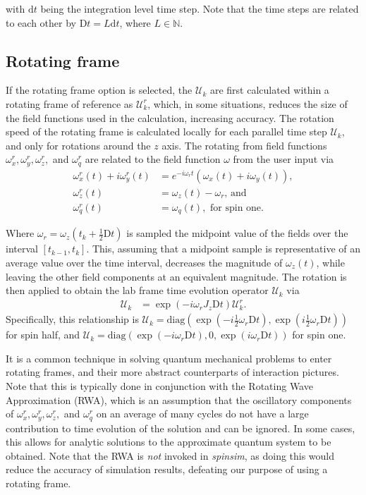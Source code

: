 \documentclass{jors}
\begin{document}
		with \(\mathrm{d}t\) being the integration level time step.
		Note that the time steps are related to each other by \(\mathrm{D}t = L\mathrm{d}t\), where \(L\in\mathbb{N}\).

	\subsection{Rotating frame}
		If the rotating frame option is selected, the \(\mathcal{U}_k\) are first calculated within a rotating frame of reference as \(\mathcal{U}^r_k\), which, in some situations, reduces the size of the field functions used in the calculation, increasing accuracy.
		The rotation speed of the rotating frame is calculated locally for each parallel time step \(\mathcal{U}_k\), and only for rotations around the \(z\) axis.
		The rotating from field functions \(\omega^r_x, \omega^r_y, \omega^r_z,\) and \(\omega^r_q\) are related to the field function \(\omega\) from the user input via
		\begin{align}
			\omega^r_x(t) + i\omega^r_y(t) &= e^{-i \omega_r t}(\omega_x(t) + i\omega_y(t)),\\
			\omega^r_z(t) &= \omega_z(t) - \omega_r\textrm{, and}\\
			\omega^r_q(t) &= \omega_q(t), \textrm{ for spin one.}
		\end{align}
		
		Where \(\omega_r = \omega_z(t_k + \frac12\mathrm{D}t)\) is sampled the midpoint value of the fields over the interval \([t_{k - 1}, t_k]\).
		This, assuming that a midpoint sample is representative of an average value over the time interval, decreases the magnitude of \(\omega_z(t)\), while leaving the other field components at an equivalent magnitude.
		The rotation is then applied to obtain the lab frame time evolution operator \(\mathcal{U}_k\) via
		\begin{align}
			\mathcal{U}_k &= \exp(-i \omega_r J_z \mathrm{D}t) \mathcal{U}^r_k.
		\end{align}
		Specifically, this relationship is \(\mathcal{U}_k = \mathrm{diag}\left(\exp\left(-i \frac12 \omega_r \mathrm{D}t\right), \exp\left(i \frac12 \omega_r \mathrm{D}t\right)\right)\) for spin half, and \(\mathcal{U}_k = \mathrm{diag}(\exp(-i \omega_r \mathrm{D}t), 0, \exp(i \omega_r \mathrm{D}t))\) for spin one.

		It is a common technique in solving quantum mechanical problems to enter rotating frames, and their more abstract counterparts of interaction pictures\cite{j_j_sakurai_jun_john_modern_1994}.
		Note that this is typically done in conjunction with the Rotating Wave Approximation (RWA), which is an assumption that the oscillatory components of \(\omega^r_x, \omega^r_y, \omega^r_z,\) and \(\omega^r_q\) on an average of many cycles do not have a large contribution to time evolution of the solution and can be ignored.
		In some cases, this allows for analytic solutions to the approximate quantum system to be obtained.
		Note that the RWA is \emph{not} invoked in \emph{spinsim}, as doing this would reduce the accuracy of simulation results, defeating our purpose of using a rotating frame.
		
\end{document}
